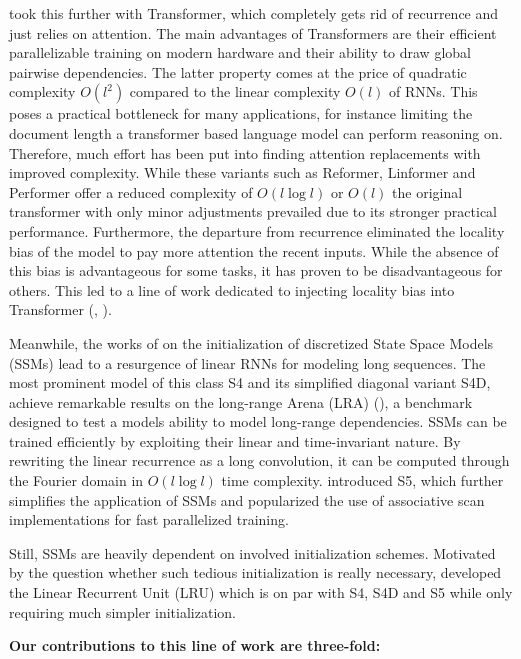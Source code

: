 \cite{vaswani2023attention} took this further with Transformer, which completely gets rid of recurrence and just relies on attention. The main advantages of Transformers are their efficient parallelizable training on modern hardware and their ability to draw global pairwise dependencies. The latter property comes at the price of quadratic complexity $O(l^2)$ compared to the linear complexity $O(l)$ of RNNs. This poses a practical bottleneck for many applications, for instance limiting the document length a transformer based language model can perform reasoning on. Therefore, much effort has been put into finding attention replacements with improved complexity. While these variants such as Reformer, Linformer and Performer offer a reduced complexity of $O(l \log l)$ or $O(l)$ the original transformer with only minor adjustments prevailed due to its stronger practical performance. Furthermore, the departure from recurrence eliminated the locality bias of the model to pay more attention the recent inputs. While the absence of this bias is advantageous for some tasks, it has proven to be disadvantageous for others. This led to a line of work dedicated to injecting locality bias into Transformer (\cite{ma2023mega}, \cite{huang2023encoding}). 

Meanwhile, the works of \cite{gu2022efficiently} on the initialization of discretized State Space Models (SSMs) lead to a resurgence of linear RNNs for modeling long sequences. The most prominent model of this class S4 and its simplified diagonal variant S4D, achieve remarkable results on the long-range Arena (LRA) (\cite{tay2020long}), a benchmark designed to test a models ability to model long-range dependencies. SSMs can be trained efficiently by exploiting their linear and time-invariant nature. By rewriting the linear recurrence as a long convolution, it can be computed through the Fourier domain in $O(l \log l)$ time complexity. \cite{smith2023simplified} introduced S5, which further simplifies the application of SSMs and popularized the use of associative scan implementations for fast parallelized training.

Still, SSMs are heavily dependent on involved initialization schemes. Motivated by the question whether such tedious initialization is really necessary, \cite{orvieto2023resurrecting} developed the Linear Recurrent Unit (LRU) which is on par with S4, S4D and S5 while only requiring much simpler initialization. 

\textbf{Our contributions to this line of work are three-fold:}

